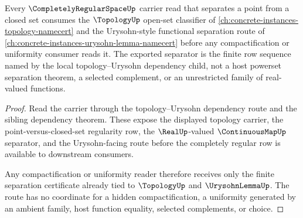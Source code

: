 \begin{theorem}
\label{thm:completely-regular-space-urysohn-sibling-route}
Every $\CompletelyRegularSpaceUp$ carrier read that separates a point from a closed set consumes the $\TopologyUp$ open-set classifier of \autoref{ch:concrete-instances-topology-namecert} and the Urysohn-style functional separation route of \autoref{ch:concrete-instances-urysohn-lemma-namecert} before any compactification or uniformity consumer reads it. The exported separator is the finite row sequence named by the local topology--Urysohn dependency child, not a host powerset separation theorem, a selected complement, or an unrestricted family of real-valued functions.
\end{theorem}
\begin{proof}
Read the carrier through the topology--Urysohn dependency route and the sibling dependency theorem. These expose the displayed topology carrier, the point-versus-closed-set regularity row, the $\RealUp$-valued $\ContinuousMapUp$ separator, and the Urysohn-facing route before the completely regular row is available to downstream consumers.

Any compactification or uniformity reader therefore receives only the finite separation certificate already tied to $\TopologyUp$ and $\UrysohnLemmaUp$. The route has no coordinate for a hidden compactification, a uniformity generated by an ambient family, host function equality, selected complements, or choice.
\end{proof}
